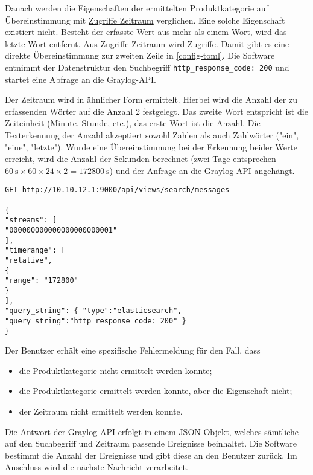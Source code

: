Danach werden die Eigenschaften der ermittelten Produktkategorie auf Übereinstimmung mit \uline{Zugriffe Zeitraum} verglichen. Eine solche Eigenschaft existiert nicht. Besteht der erfasste Wert aus mehr als einem Wort, wird das letzte Wort entfernt. Aus \uline{Zugriffe Zeitraum} wird \uline{Zugriffe}. Damit gibt es eine direkte Übereinstimmung zur zweiten Zeile in \autoref{config-toml}. Die Software entnimmt der Datenstruktur den Suchbegriff \lstinline{http_response_code: 200} und startet eine Abfrage an die Graylog-API.

Der Zeitraum wird in ähnlicher Form ermittelt. Hierbei wird die Anzahl der zu erfassenden Wörter auf die Anzahl 2 festgelegt. Das zweite Wort entspricht ist die Zeiteinheit (Minute, Stunde, etc.), das erste Wort ist die Anzahl. Die Texterkennung der Anzahl akzeptiert sowohl Zahlen als auch Zahlwörter ("ein", "eine", "letzte"). Wurde eine Übereinstimmung bei der Erkennung beider Werte erreicht, wird die Anzahl der Sekunden berechnet (zwei Tage entsprechen $60~\mathrm{s} \times 60 \times 24 \times 2 = 172800~\mathrm{s}$) und der Anfrage an die Graylog-API angehängt.

\begin{lstlisting}[caption={Anfrage der Software an Graylog mit den ermittelten Daten}, label=graylog-query, xleftmargin=6mm]
GET http://10.10.12.1:9000/api/views/search/messages

{
"streams": [
"000000000000000000000001"
],
"timerange": [
"relative",
{
"range": "172800"
}
],
"query_string": { "type":"elasticsearch", "query_string":"http_response_code: 200" }
}
\end{lstlisting}

Der Benutzer erhält eine spezifische Fehlermeldung für den Fall, dass

\begin{itemize}
\item die Produktkategorie nicht ermittelt werden konnte;
\item die Produktkategorie ermittelt werden konnte, aber die Eigenschaft nicht;
\item der Zeitraum nicht ermittelt werden konnte.
\end{itemize}

Die Antwort der Graylog-API erfolgt in einem JSON-Objekt, welches sämtliche auf den Suchbegriff und Zeitraum passende Ereignisse beinhaltet. Die Software bestimmt die Anzahl der Ereignisse und gibt diese an den Benutzer zurück. Im Anschluss wird die nächste Nachricht verarbeitet.

